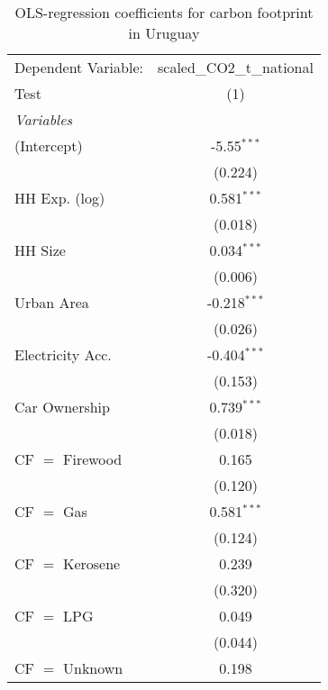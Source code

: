
\begin{table}[htbp!]
   \centering
   \small
   \begin{adjustbox}{width = 1\textwidth, max height = 0.95\textheight, center}
      \begin{threeparttable}[b]
         \caption{\label{tab:OLS_2_URY} OLS-regression coefficients for carbon footprint in Uruguay}
         \begin{tabular}{lc}
            \tabularnewline \midrule \midrule
            Dependent Variable: & scaled\_CO2\_t\_national\\     
            Test                & (1)\\  
            \midrule
            \emph{Variables}\\
            (Intercept)         & -5.55$^{***}$\\   
                                & (0.224)\\   
            HH Exp. (log)       & 0.581$^{***}$\\   
                                & (0.018)\\   
            HH Size             & 0.034$^{***}$\\   
                                & (0.006)\\   
            Urban Area          & -0.218$^{***}$\\   
                                & (0.026)\\   
            Electricity Acc.    & -0.404$^{***}$\\   
                                & (0.153)\\   
            Car Ownership       & 0.739$^{***}$\\   
                                & (0.018)\\   
            CF $=$ Firewood     & 0.165\\   
                                & (0.120)\\   
            CF $=$ Gas          & 0.581$^{***}$\\   
                                & (0.124)\\   
            CF $=$ Kerosene     & 0.239\\   
                                & (0.320)\\   
            CF $=$ LPG          & 0.049\\   
                                & (0.044)\\   
            CF $=$ Unknown      & 0.198\\   

\end{tabular}
\end{threeparttable}
\end{adjustbox}
\end{table}
